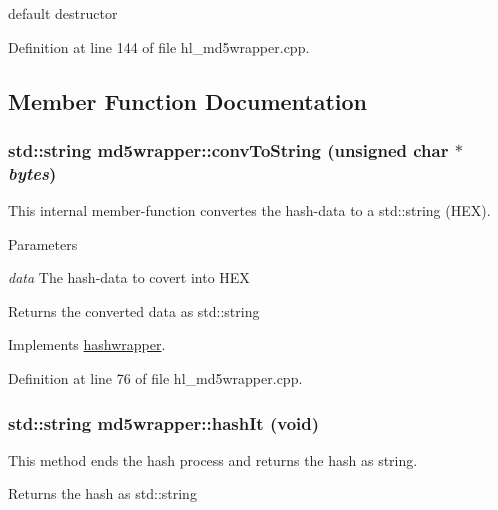 default destructor 

Definition at line 144 of file hl\_\-md5wrapper.cpp.

\subsection{Member Function Documentation}
\hypertarget{classmd5wrapper_a4b2bd3d8cb53e4f24d843b1c17089c9c}{
\subsubsection[{convToString}]{\setlength{\rightskip}{0pt plus 5cm}std::string md5wrapper::convToString (unsigned char $\ast$ {\em bytes})}}
\label{classmd5wrapper_a4b2bd3d8cb53e4f24d843b1c17089c9c}


This internal member-\/function convertes the hash-\/data to a std::string (HEX). 
\begin{DoxyParams}{Parameters}
\item[{\em data}]The hash-\/data to covert into HEX \end{DoxyParams}
\begin{DoxyReturn}{Returns}
the converted data as std::string 
\end{DoxyReturn}


Implements \hyperlink{classhashwrapper_a1dacf43b1b726cd19a09d11eba6cd082}{hashwrapper}.

Definition at line 76 of file hl\_\-md5wrapper.cpp.\hypertarget{classmd5wrapper_ab146103eb1283aaf0a83ae5e8101af26}{
\subsubsection[{hashIt}]{\setlength{\rightskip}{0pt plus 5cm}std::string md5wrapper::hashIt (void)}}
\label{classmd5wrapper_ab146103eb1283aaf0a83ae5e8101af26}


This method ends the hash process and returns the hash as string. \begin{DoxyReturn}{Returns}
the hash as std::string 
\end{DoxyReturn}


